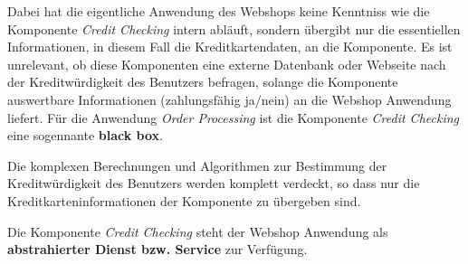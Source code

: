 Dabei hat die eigentliche Anwendung des Webshops keine Kenntniss wie die Komponente \textit{Credit Checking} intern abläuft, sondern übergibt nur die essentiellen Informationen, in diesem Fall die Kreditkartendaten, an die Komponente.
Es ist unrelevant, ob diese Komponenten eine externe Datenbank oder Webseite nach der Kreditwürdigkeit des Benutzers befragen, solange die Komponente auswertbare Informationen (zahlungsfähig ja/nein) an die Webshop Anwendung liefert.
Für die Anwendung \textit{Order Processing} ist die Komponente \textit{Credit Checking} eine sogennante \textbf{black box}.

Die komplexen Berechnungen und Algorithmen zur Bestimmung der Kreditwürdigkeit des Benutzers werden komplett verdeckt, so dass nur die Kreditkarteninformationen der Komponente zu übergeben sind.

Die Komponente \textit{Credit Checking} steht der Webshop Anwendung als \textbf{abstrahierter Dienst bzw. Service} zur Verfügung.
